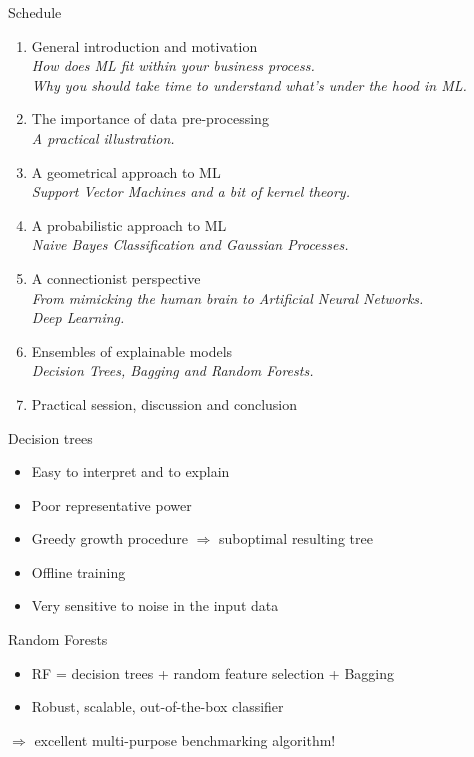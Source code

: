 \documentclass{beamer}
\begin{document}
\begin{frame}{Schedule}
\begin{enumerate}
\item General introduction and motivation \Checkmark \\
{\small \it How does ML fit within your business process.\\
Why you should take time to understand what's under the hood in ML.}
\item The importance of data pre-processing \Checkmark \\
{\small \it A practical illustration.}
\item A geometrical approach to ML \Checkmark \\
{\small \it Support Vector Machines and a bit of kernel theory.}
\item A probabilistic approach to ML \Checkmark \\
{\small \it Naive Bayes Classification and Gaussian Processes.}
\item A connectionist perspective \Checkmark \\
{\small \it From mimicking the human brain to Artificial Neural Networks.\\
Deep Learning.}
\item Ensembles of explainable models\\
{\small \it Decision Trees, Bagging and Random Forests.}
\item Practical session, discussion and conclusion
\end{enumerate}
\end{frame}

\begin{frame}{Decision trees}
\begin{itemize}
\item Easy to interpret and to explain
\item Poor representative power
\item Greedy growth procedure $\Rightarrow$ suboptimal resulting tree
\item Offline training
\item Very sensitive to noise in the input data
\end{itemize}
\end{frame}

\begin{frame}{Random Forests}
\begin{itemize}
\item RF = decision trees + random feature selection + Bagging
\item Robust, scalable, out-of-the-box classifier
\end{itemize}
$\Rightarrow$ excellent multi-purpose benchmarking algorithm!
\end{frame}
\end{document}
